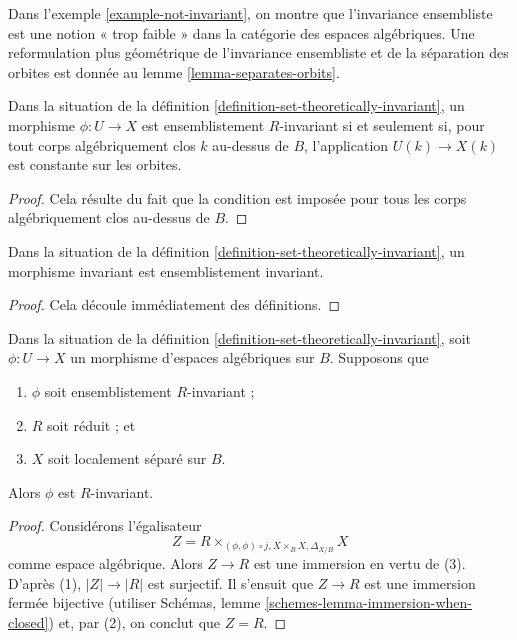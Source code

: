 \noindent
Dans
l'exemple \ref{example-not-invariant},
on montre que l'invariance ensembliste est une notion « trop faible » dans
la catégorie des espaces algébriques. Une reformulation plus géométrique
de l'invariance ensembliste et de la séparation des orbites est donnée au
lemme \ref{lemma-separates-orbits}.

\begin{lemma}
\label{lemma-set-theoretic-invariant}
Dans la situation de la définition \ref{definition-set-theoretically-invariant},
un morphisme $\phi : U \to X$ est ensemblistement $R$-invariant si et
seulement si, pour tout corps algébriquement clos $k$ au-dessus de $B$, l'application
$U(k) \to X(k)$ est constante sur les orbites.
\end{lemma}

\begin{proof}
Cela résulte du fait que la condition est imposée pour tous les corps
algébriquement clos au-dessus de $B$.
\end{proof}

\begin{lemma}
\label{lemma-invariant-set-theoretically-invariant}
Dans la situation de la définition \ref{definition-set-theoretically-invariant},
un morphisme invariant est ensemblistement invariant.
\end{lemma}

\begin{proof}
Cela découle immédiatement des définitions.
\end{proof}

\begin{lemma}
\label{lemma-set-theoretically-invariant-invariant-when-reduced}
Dans la situation de la définition \ref{definition-set-theoretically-invariant},
soit $\phi : U \to X$ un morphisme d'espaces algébriques sur $B$.
Supposons que
\begin{enumerate}
\item $\phi$ soit ensemblistement $R$-invariant ;
\item $R$ soit réduit ; et
\item $X$ soit localement séparé sur $B$.
\end{enumerate}
Alors $\phi$ est $R$-invariant.
\end{lemma}

\begin{proof}
Considérons l'égalisateur
$$
Z = R \times_{(\phi, \phi) \circ j, X \times_B X, \Delta_{X/B}} X
$$
comme espace algébrique. Alors $Z \to R$ est une immersion en vertu de (3).
D'après (1), $|Z| \to |R|$ est surjectif. Il s'ensuit que
$Z \to R$ est une immersion fermée bijective (utiliser
Schémas, lemme \ref{schemes-lemma-immersion-when-closed})
et, par (2), on conclut que $Z = R$.
\end{proof}

